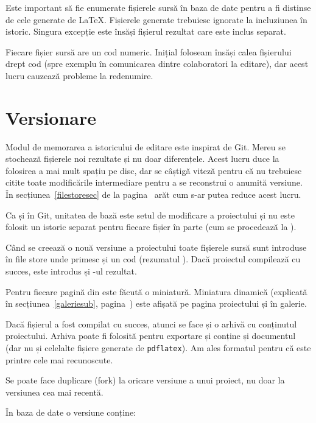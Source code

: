 \documentclass[a4wide,12pt]{report}
\newcommand{\eng}[1]{{#1}} %
\newcommand{\cod}[1]{\texttt{#1}}
\newcommand{\acr}[1]{{\textsmaller[1]{\textsc{#1}}}} %
\begin{document}
Este important să fie enumerate fișierele sursă în baza de date pentru a fi
distinse de cele generate de \LaTeX{}. Fișierele generate trebuiesc ignorate la
incluziunea în istoric. Singura excepție este însăși fișierul \acr{PDF} rezultat
care este inclus separat.

Fiecare fișier sursă are un cod numeric. Inițial foloseam însăși calea
fișierului drept cod (spre exemplu în comunicarea dintre colaboratori la
editare), dar acest lucru cauzează probleme la redenumire.

\section{Versionare}
\label{versionaresec}

Modul de memorarea a istoricului de editare este inspirat de Git. Mereu se
stochează fișierele noi rezultate și nu doar diferențele. Acest lucru duce la
folosirea a mai mult spațiu pe disc, dar se câștigă viteză pentru că nu
trebuiesc citite toate modificările intermediare pentru a se reconstrui o
anumită versiune. În secțiunea~\ref{filestoresec} de la
pagina~\pageref{filestoresec} arăt cum s-ar putea reduce acest lucru.

Ca și în Git, unitatea de bază este setul de modificare a proiectului și nu este
folosit un istoric separat pentru fiecare fișier în parte (cum se procedează la
\acr{SVN}).

Când se creează o nouă versiune a proiectului toate fișierele sursă sunt
introduse în \eng{file store} unde primesc și un cod (rezumatul \acr{SHA1}).
Dacă proiectul compilează cu succes, este introdus și \acr{PDF}-ul rezultat.

Pentru fiecare pagină din \acr{PDF} este făcută o miniatură. Miniatura dinamică
(explicată în secțiunea~\ref{galeriesub}, pagina~\pageref{galeriesub}) este
afișată pe pagina proiectului și în galerie.

Dacă fișierul a fost compilat cu succes, atunci se face și o arhivă \acr{ZIP} cu
conținutul proiectului. Arhiva poate fi folosită pentru exportare și conține și
documentul \acr{PDF} (dar nu și celelalte fișiere generate de \cod{pdflatex}).
Am ales formatul \acr{ZIP} pentru că este printre cele mai recunoscute.

Se poate face duplicare (\eng{fork}) la oricare versiune a unui proiect, nu doar
la versiunea cea mai recentă.

În baza de date o versiune conține:
\end{document}
